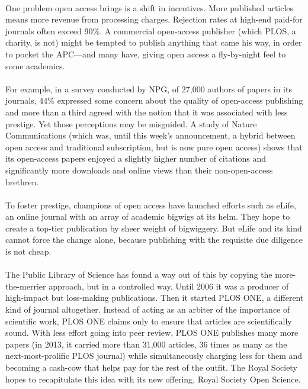 \documentclass[a4paper, 12pt, UTF8]{article}
\begin{document}
\paragraph*{}
    One problem open access brings is a shift in incentives. More published articles means more revenue from processing charges. Rejection rates at high-end paid-for journals often exceed 90\%. A commercial open-access publisher (which PLOS, a charity, is not) might be tempted to publish anything that came his way, in order to pocket the APC—and many have, giving open access a fly-by-night feel to some academics.

\paragraph*{}
    For example, in a survey conducted by NPG, of 27,000 authors of papers in its journals, 44\% expressed some concern about the quality of open-access publishing and more than a third agreed with the notion that it was associated with less prestige. Yet those perceptions may be misguided. A study of Nature Communications (which was, until this week’s announcement, a hybrid between open access and traditional subscription, but is now pure open access) shows that its open-access papers enjoyed a slightly higher number of citations and significantly more downloads and online views than their non-open-access brethren.

\paragraph*{}
    To foster prestige, champions of open access have launched efforts such as eLife, an online journal with an array of academic bigwigs at its helm. They hope to create a top-tier publication by sheer weight of bigwiggery. But eLife and its kind cannot force the change alone, because publishing with the requisite due diligence is not cheap.

\paragraph*{}
    The Public Library of Science has found a way out of this by copying the more-the-merrier approach, but in a controlled way. Until 2006 it was a producer of high-impact but loss-making publications. Then it started PLOS ONE, a different kind of journal altogether. Instead of acting as an arbiter of the importance of scientific work, PLOS ONE claims only to ensure that articles are scientifically sound. With less effort going into peer review, PLOS ONE publishes many more papers (in 2013, it carried more than 31,000 articles, 36 times as many as the next-most-prolific PLOS journal) while simultaneously charging less for them and becoming a cash-cow that helps pay for the rest of the outfit. The Royal Society hopes to recapitulate this idea with its new offering, Royal Society Open Science.
\end{document}
